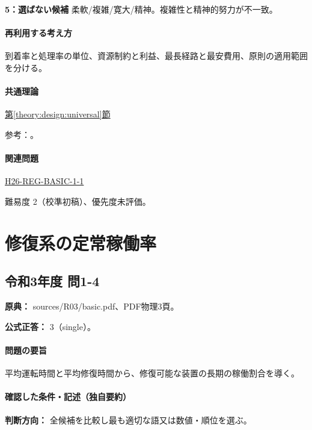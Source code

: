 \noindent\textbf{5：選ばない候補} 柔軟/複雑/寛大/精神。複雑性と精神的努力が不一致。\par

\paragraph{再利用する考え方} 到着率と処理率の単位、資源制約と利益、最長経路と最安費用、原則の適用範囲を分ける。

\paragraph{共通理論} \hyperref[theory:design:universal]{第\ref*{theory:design:universal}節}

\par 参考：\cite{design48_ud}。

\paragraph{関連問題} \hyperref[q:h26-reg-basic-1-1]{H26-REG-BASIC-1-1}

\par 難易度 2（校準初稿）、優先度未評価。

\section{修復系の定常稼働率}

\subsection{令和3年度 問1-4}
\label{q:r03-reg-basic-1-4}

\noindent\textbf{原典：} sources/R03/basic.pdf、PDF物理3頁。

\textbf{公式正答：} 3（single）。

\paragraph{問題の要旨} 平均運転時間と平均修復時間から、修復可能な装置の長期の稼働割合を導く。

\paragraph{確認した条件・記述（独自要約）}\mbox{}\par

\noindent\textbf{判断方向：} 全候補を比較し最も適切な語又は数値・順位を選ぶ。\par

